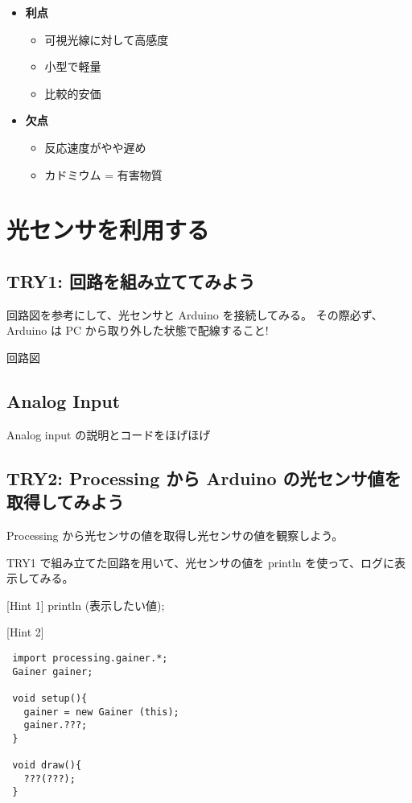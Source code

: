 \documentclass[11pt,a4paper]{jarticle}
\begin{document}
\begin{itemize}
 \item \textbf{利点}
       \begin{itemize}
	\item 可視光線に対して高感度
	\item 小型で軽量
	\item 比較的安価
       \end{itemize}
 \item \textbf{欠点}
       \begin{itemize}
	\item 反応速度がやや遅め
	\item カドミウム = 有害物質
       \end{itemize}
\end{itemize}


\section{光センサを利用する}

\subsection*{TRY1: 回路を組み立ててみよう}
回路図を参考にして、光センサと Arduino を接続してみる。
その際必ず、Arduino は PC から取り外した状態で配線すること!

回路図

\subsection*{Analog Input}
Analog input の説明とコードをほげほげ


\subsection*{TRY2: Processing から Arduino の光センサ値を取得してみよう}
Processing から光センサの値を取得し光センサの値を観察しよう。

TRY1 で組み立てた回路を用いて、光センサの値を println を使って、ログに表示してみる。

[Hint 1]
println (表示したい値);

[Hint 2]

\begin{lstlisting}
 import processing.gainer.*;
 Gainer gainer;

 void setup(){
   gainer = new Gainer (this);
   gainer.???;
 }

 void draw(){
   ???(???);
 }
\end{lstlisting}
\end{document}
